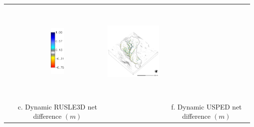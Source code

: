 \documentclass{standalone}
\begin{document}
\begin{tabular}{m{} m{} m{} m{}}
& \multicolumn{1}{c}{\includegraphics[height=25mm]{../../images/usped_3d/legend_difference.png}}
& \multicolumn{1}{c}{\includegraphics[height=50mm]{../../images/usped_3d/difference_carto.png}}\\
\multicolumn{1}{c}{} 
& \multicolumn{1}{c}{c. Dynamic RUSLE3D net difference $(m)$}
& \multicolumn{1}{c}{} 
& \multicolumn{1}{c}{f. Dynamic USPED net difference $(m)$}\\

%
\end{tabular}

\end{document}
